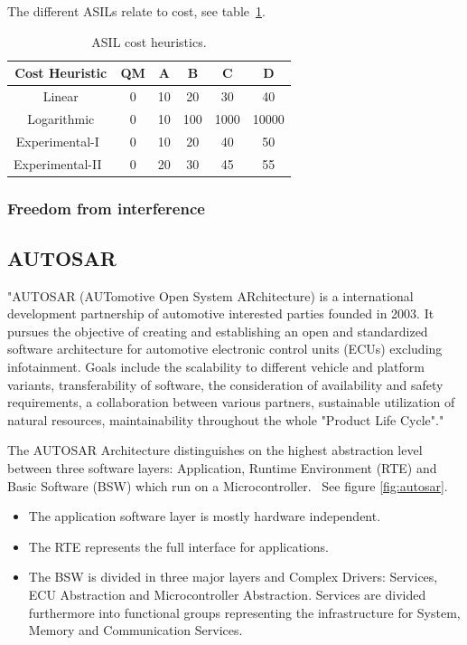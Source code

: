 The different ASILs relate to cost, see table~\ref{table:cost_heuritics}. %

\begin{table}[H]
\centering
\begin{tabular}{|c|c|c|c|c|c|}
\hline
\textbf{Cost Heuristic} & \textbf{QM} & \textbf{A} & \textbf{B} & \textbf{C} & \textbf{D} \\ \hline
Linear & 0 & 10 & 20 & 30 & 40 \\ \hline
Logarithmic & 0 & 10 & 100 & 1000 & 10000 \\ \hline
Experimental-I~\cite{azevedo2014} & 0 & 10 & 20 & 40 & 50 \\ \hline
Experimental-II~\cite{azevedo2014} & 0 & 20 & 30 & 45 & 55 \\ \hline
\end{tabular}
\caption{ASIL cost heuristics.}
\label{table:cost_heuritics}
\end{table}


\subsubsection{Freedom from interference}



\subsection{AUTOSAR}
"AUTOSAR (AUTomotive Open System ARchitecture) is a international development partnership of automotive interested parties founded in 2003. It pursues the objective of creating and establishing an open and standardized software architecture for automotive electronic control units (ECUs) excluding infotainment. Goals include the scalability to different vehicle and platform variants, transferability of software, the consideration of availability and safety requirements, a collaboration between various partners, sustainable utilization of natural resources, maintainability throughout the whole "Product Life Cycle"."~\cite{website:autosar}

The AUTOSAR Architecture distinguishes on the highest abstraction level between three software layers: Application, Runtime Environment (RTE) and Basic Software (BSW) which run on a Microcontroller.~\cite{website:autosar} See figure \ref{fig:autosar}.
\begin{itemize}
\item The application software layer is mostly hardware independent.
\item The RTE represents the full interface for applications.
\item The BSW is divided in three major layers and Complex Drivers: Services, ECU Abstraction and Microcontroller Abstraction. Services are divided furthermore into functional groups representing the infrastructure for System, Memory and Communication Services.
\end{itemize}

